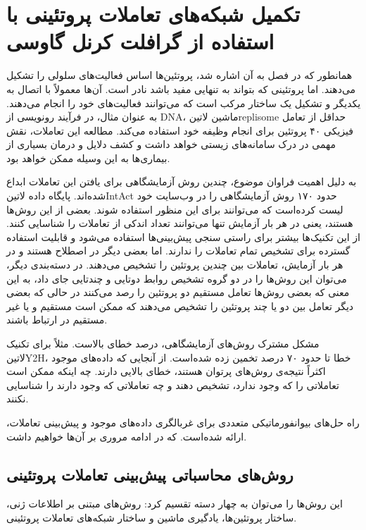 \chapter{تکمیل شبکه‌های تعاملات پروتئینی با استفاده از گرافلت کرنل گاوسی}\label{chap:network-completion-problem-ppi}
همانطور که در فصل  به آن اشاره شد، پروتئین‌ها اساس فعالیت‌های سلولی را تشکیل می‌دهند. اما پروتئینی که بتواند به تنهایی مفید باشد نادر است. آن‌ها معمولاً با اتصال به یکدیگر و تشکیل یک ساختار مرکب است که می‌توانند فعالیت‌های خود را انجام می‌دهند. به عنوان مثال، در فرآیند رونویسی از DNA، ماشین ‌لاتین{replisome} حداقل از تعامل فیزیکی ۴۰ پروتئین برای انجام وظیفه خود استفاده می‌کند. مطالعه این تعاملات، نقش مهمی در درک سامانه‌های زیستی خواهد داشت و کشف دلایل و درمان بسیاری از بیماری‌ها به این وسیله ممکن خواهد بود.

به دلیل اهمیت فراوان موضوع، چندین روش آزمایشگاهی برای یافتن این تعاملات ابداع شده‌اند. پایگاه داده ‌لاتین{IntAct} حدود ۱۷۰ روش آزمایشگاهی را در وب‌سایت خود لیست کرده‌است که می‌توانند برای این منظور استفاده شوند. بعضی از این روش‌ها  هستند، یعنی در هر بار آزمایش تنها می‌توانند تعداد اندکی از تعاملات را شناسایی کنند. از این تکنیک‌ها بیشتر برای راستی سنجی پیش‌بینی‌ها استفاده می‌شود و قابلیت استفاده گسترده برای تشخیص تمام تعاملات را ندارند. اما بعضی دیگر در اصطلاح  هستند و در هر بار آزمایش، تعاملات بین چندین پروتئین را تشخیص می‌دهند. در دسته‌بندی دیگر، می‌توان این روش‌ها را در دو گروه تشخیص روابط دوتایی و چندتایی جای داد، به این معنی که بعضی روش‌ها تعامل مستقیم دو پروتئین را رصد می‌کنند در حالی که بعضی دیگر تعامل بین دو یا چند پروتئین را تشخیص می‌دهند که ممکن است مستقیم و یا غیر مستقیم در ارتباط باشند.

مشکل مشترک روش‌های آزمایشگاهی، درصد خطای بالاست. مثلاً برای تکنیک ‌لاتین{Y2H}، خطا تا حدود ۷۰ درصد تخمین زده شده‌است. از آنجایی که داده‌های موجود اکثراً نتیجه‌ی روش‌های پرتوان هستند، خطای بالایی دارند. چه اینکه ممکن است تعاملاتی را که وجود ندارد، تشخیص دهند و چه تعاملاتی که وجود دارند را شناسایی نکنند.

راه حل‌های بیوانفورماتیکی متعددی برای غربالگری داده‌های موجود و پیش‌بینی تعاملات، ارائه شده‌است. که در ادامه مروری بر آن‌ها خواهیم داشت.

\section{روش‌های محاسباتی پیش‌بینی تعاملات پروتئینی}
این روش‌ها را می‌توان به چهار دسته تقسیم کرد: روش‌های مبتنی بر اطلاعات ژنی، ساختار پروتئین‌ها، یادگیری ماشین و ساختار شبکه‌های تعاملات پروتئینی.

